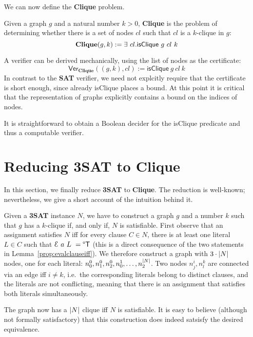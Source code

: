 \documentclass[a4paper,UKenglish,cleveref, autoref]{lipics-v2019}
\begin{document}
We can now define the \textbf{Clique} problem.

\begin{definition}
  Given a graph $g$ and a natural number $k > 0$, \textbf{Clique} is the problem of determining whether there is a set of nodes $cl$ such that $cl$ is a $k$-clique in $g$:
  \[\normalfont\textbf{Clique} (g, k) := \exists~cl. \normalfont\textsf{isClique}~g~cl~k \]
\end{definition}

A verifier can be derived mechanically, using the list of nodes as the certificate:
\[\textsf{Ver}_{\textbf{Clique}} ((g, k), cl) := \textsf{isClique}~g~cl~k \]
In contrast to the \textbf{SAT} verifier, we need not explcitly require that the certificate is short enough, since already \textsf{isClique} places a bound. At this point it is critical that the representation of graphs explicitly contains a bound on the indices of nodes.

It is straightforward to obtain a Boolean decider for the \textsf{isClique} predicate and thus a computable verifier.

\section{Reducing \textbf{3SAT} to \textbf{Clique}}
In this section, we finally reduce \textbf{3SAT} to \textbf{Clique}. The reduction is well-known; nevertheless, we give a short account of the intuition behind it. 

Given a \textbf{3SAT} instance $N$, we have to construct a graph $g$ and a number $k$ such that $g$ has a $k$-clique if, and only if, $N$ is satisfiable. First observe that an assignment satisfies $N$ iff for every clause $C \in N$, there is at least one literal $L \in C$ such that $\mathcal{E}~a~L~ = \degree\mathsf{T}$ (this is a direct consequence of the two statements in Lemma~\ref{prop:evalclauseiff}). 
We therefore construct a graph with $3 \cdot |N|$ nodes, one for each literal: $n^0_0, n^0_1, n^0_2, n^1_0, \ldots, n^{|N|}_2$. Two nodes $n^i_j, n^k_l$ are connected via an edge iff $i \neq k$, i.e.\ the corresponding literals belong to distinct clauses, and the literals are not conflicting, meaning that there is an assignment that satisfies both literals simultaneously.

The graph now has a $|N|$ clique iff $N$ is satisfiable.
It is easy to believe (although not formally satisfactory) that this construction does indeed satsisfy the desired equivalence. 
\end{document}
